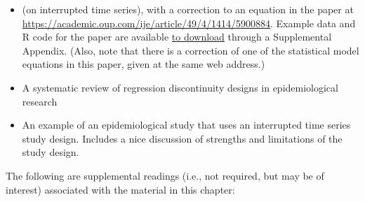 \documentclass[
]{book}
\providecommand{\tightlist}{%
  \setlength{\itemsep}{0pt}\setlength{\parskip}{0pt}}
\begin{document}
\begin{itemize}
\tightlist
\item
  \citet{bernal2017interrupted} (on interrupted time series), with a correction to an equation in the paper at \url{https://academic.oup.com/ije/article/49/4/1414/5900884}. Example data and R code for the paper are available \href{https://oup.silverchair-cdn.com/oup/backfile/Content_public/Journal/ije/49/4/10.1093_ije_dyaa118/1/dyaa118_supplementary_data.zip?Expires=1623897009\&Signature=BzYQrBg60cMKHYeDU~OIZYIFuRgEIPwQsWMjzON0dB~fL8y-8x4xdGIJQBBPgDxBIoUIGnjmShVf1jlVqzloo3IldAdVC78TZ~~XseYdJ9c590QRAR6m7mH~VbPe-fCnQSnZF0z2Qw9PZcSGITZeNr4YXPVY-~gtpgBeZiN0MpgEVBLVT5fYhhQBGbp0vxl1bKdUfNtF71fdVJrglkhSG8-M24A07LmAr8jThx4MQmSAzKCxA4VZLRE6To8zC3-rJlxyWiqrSTFsVQM2SN4R6UuxYoRsILRcIAr2sUfqgmaSlxBiYAf71PdGSrnBcXX3l0l7yuAftX5PYTwMKTyxOA__\&Key-Pair-Id=APKAIE5G5CRDK6RD3PGA}{to download} through a Supplemental Appendix. (Also, note that there is a correction of one of the statistical model equations in this paper, given at the same web address.)
\item
  \citet{bor2014regression} A systematic review of regression discontinuity designs in epidemiological research
\item
  \citet{lopez2013effect} An example of an epidemiological study that uses an interrupted time series study design. Includes a nice discussion of strengths and limitations of the study design.
\end{itemize}

The following are supplemental readings (i.e., not required, but may be of
interest) associated with the material in this chapter:
\end{document}
